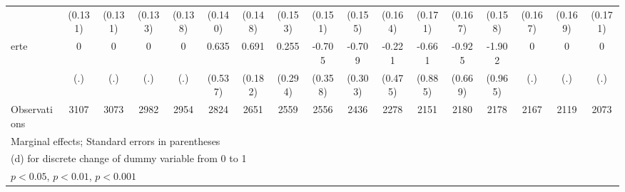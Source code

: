 {\begin{tabular}{l*{16}{c}}
                    &     (0.131)         &     (0.131)         &     (0.133)         &     (0.138)         &     (0.140)         &     (0.148)         &     (0.153)         &     (0.151)         &     (0.155)         &     (0.164)         &     (0.171)         &     (0.167)         &     (0.158)         &     (0.167)         &     (0.169)         &     (0.171)         \\
[1em]
erte                &           0         &           0         &           0         &           0         &       0.635         &       0.691\sym{***}&       0.255         &      -0.705\sym{*}  &      -0.709\sym{*}  &      -0.221         &      -0.661         &      -0.925         &      -1.902\sym{*}  &           0         &           0         &           0         \\
                    &         (.)         &         (.)         &         (.)         &         (.)         &     (0.537)         &     (0.182)         &     (0.294)         &     (0.358)         &     (0.303)         &     (0.475)         &     (0.885)         &     (0.669)         &     (0.965)         &         (.)         &         (.)         &         (.)         \\
\hline
Observations        &        3107         &        3073         &        2982         &        2954         &        2824         &        2651         &        2559         &        2556         &        2436         &        2278         &        2151         &        2180         &        2178         &        2167         &        2119         &        2073         \\
\hline\hline
\multicolumn{17}{l}{\footnotesize Marginal effects; Standard errors in parentheses}\\
\multicolumn{17}{l}{\footnotesize  (d) for discrete change of dummy variable from 0 to 1}\\
\multicolumn{17}{l}{\footnotesize \sym{*} \(p<0.05\), \sym{**} \(p<0.01\), \sym{***} \(p<0.001\)}\\
\end{tabular}
}

